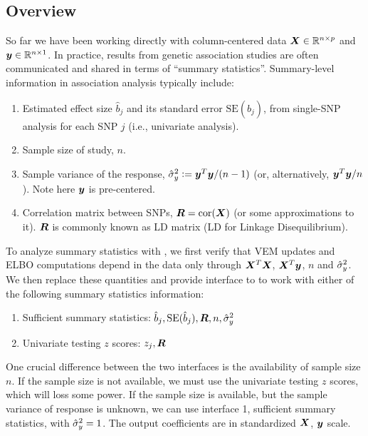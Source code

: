 \subsection{Overview}
So far we have been working directly with column-centered data $\bm X\in \mathbb{R}^{n\times p}$ and $\bm y\in\mathbb{R}^{n\times 1}$. In practice, results from genetic association studies are often communicated and shared in terms of ``summary statistics''. Summary-level information in association analysis typically include:
\begin{enumerate}
\item Estimated effect size $\hat{b}_j$ and its standard error $\text{SE}(\hat{b}_j)$, from single-SNP analysis for each SNP $j$ (i.e., univariate analysis). 
\item Sample size of study, $n$.
\item Sample variance of the response, $\hat{\sigma}_y^2 := \bm y^T\bm y/(n-1)$ (or, alternatively, $\bm y^T\bm y/n$). Note here $\bm y$ is pre-centered. 
\item Correlation matrix between SNPs, $\bm R=\text{cor}(\bm X)$ (or some approximations to it). $\bm R$ is commonly known as LD matrix (LD for Linkage Disequilibrium).
\end{enumerate}
To analyze summary statistics with \susie, we first verify that \susie VEM updates and ELBO computations depend in the data only through $\bm X^T\bm X$, $\bm X^T\bm y$, $n$ and $\hat{\sigma}_y^2$. We then replace these quantities and provide interface to \susie to work with either of the following summary statistics information:
\begin{enumerate}
    \item Sufficient summary statistics: $\hat{b}_j, \text{SE}(\hat{b}_j), \bm R, n, \hat{\sigma}_y^2$
    \item Univariate testing $z$ scores: $z_j, \bm R$
\end{enumerate}

One crucial difference between the two interfaces is the availability of sample size $n$. If the sample size is not available, we must use the univariate testing $z$ scores, which will loss some power. If the sample size is available, but the sample variance of response is unknown, we can use interface 1, sufficient summary statistics, with $\hat{\sigma}_y^2 = 1$. The output coefficients are in standardized $\bm X$, $\bm y$ scale.

